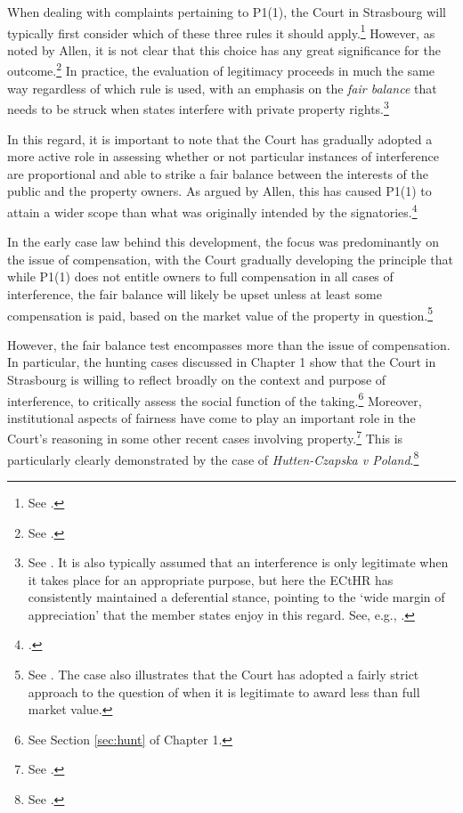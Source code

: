 When dealing with complaints pertaining to P1(1), the Court in Strasbourg will typically first consider which of these three rules it should apply.\footnote{See \cite[102-104]{allen05}.} However, as noted by Allen, it is not clear that this choice has any great significance for the outcome.\footnote{See \cite[104-105]{allen05}.} In practice, the evaluation of legitimacy proceeds in much the same way regardless of which rule is used, with an emphasis on the {\it fair balance} that needs to be struck when states interfere with private property rights.\footnote{See \cite[[103]{allen05}. It is also typically assumed that an interference is only legitimate when it takes place for an appropriate purpose, but here the ECtHR has consistently maintained a deferential stance, pointing to the `wide margin of appreciation' that the member states enjoy in this regard. See, e.g., \cite[54]{james86}.}

In this regard, it is important to note that the Court has gradually adopted a more active role in assessing whether or not particular instances of interference are proportional and able to strike a fair balance between the interests of the public and the property owners. As argued by Allen, this has caused P1(1) to attain a wider scope than what was originally intended by the signatories.\footcite[1055]{allen10}

In the early case law behind this development, the focus was predominantly on the issue of compensation, with the Court gradually developing the principle that while P1(1) does not entitle owners to full compensation in all cases of interference, the fair balance will likely be upset unless at least some compensation is paid, based on the market value of the property in question.\footnote{See \cite[103]{scordino06}. The case also illustrates that the Court has adopted a fairly strict approach to the question of when it is legitimate to award less than full market value.}

However, the fair balance test encompasses more than the issue of compensation. In particular, the hunting cases discussed in Chapter 1 show that the Court in Strasbourg is willing to reflect broadly on the context and purpose of interference, to critically assess the social function of the taking.\footnote{See Section \ref{sec:hunt} of Chapter 1.} Moreover, institutional aspects of fairness have come to play an important role in the Court's reasoning in some other recent cases involving property.\footnote{See \cite{hutten06,lindheim12}.} This is particularly clearly demonstrated by the case of {\it Hutten-Czapska v Poland}.\footnote{See \cite{hutten06}.}

